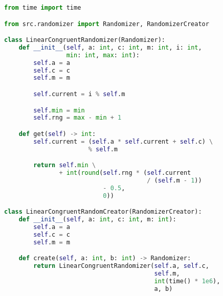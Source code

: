 \begin{lstlisting}[caption={Класс, реализующий линейный конгруэнтный метод}, language=python]
from time import time

from src.randomizer import Randomizer, RandomizerCreator

class LinearCongruentRandomizer(Randomizer):
    def __init__(self, a: int, c: int, m: int, i: int,
                 min: int, max: int):
        self.a = a
        self.c = c
        self.m = m

        self.current = i % self.m

        self.min = min
        self.rng = max - min + 1

    def get(self) -> int:
        self.current = (self.a * self.current + self.c) \
                       % self.m

        return self.min \
               + int(round(self.rng * (self.current
                                       / (self.m - 1))
                           - 0.5,
                           0))

class LinearCongruentRandomCreator(RandomizerCreator):
    def __init__(self, a: int, c: int, m: int):
        self.a = a
        self.c = c
        self.m = m

    def create(self, a: int, b: int) -> Randomizer:
        return LinearCongruentRandomizer(self.a, self.c,
                                         self.m,
                                         int(time() * 1e6),
                                         a, b)
\end{lstlisting}

